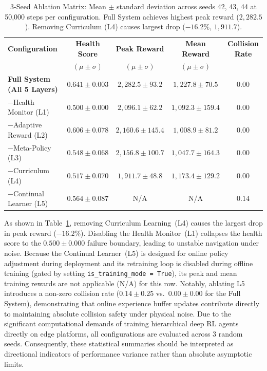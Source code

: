 \documentclass[11pt,a4paper]{article}
\begin{document}
\begin{table}[H]
\centering
\small
\begin{tabular}{lcccc}
\toprule
\textbf{Configuration} & \textbf{Health Score} & \textbf{Peak Reward} & \textbf{Mean Reward} & \textbf{Collision Rate} \\
& $(\mu \pm \sigma)$ & $(\mu \pm \sigma)$ & $(\mu \pm \sigma)$ & \\
\midrule
\textbf{Full System (All 5 Layers)} & $0.641 \pm 0.003$ & $2,282.5 \pm 93.2$ & $1,227.8 \pm 70.5$ & $0.00$ \\
$-$Health Monitor (L1) & $0.500 \pm 0.000$ & $2,096.1 \pm 62.2$ & $1,092.3 \pm 159.4$ & $0.00$ \\
$-$Adaptive Reward (L2) & $0.606 \pm 0.078$ & $2,160.6 \pm 145.4$ & $1,008.9 \pm 81.2$ & $0.00$ \\
$-$Meta-Policy (L3) & $0.548 \pm 0.068$ & $2,156.8 \pm 100.7$ & $1,047.7 \pm 164.3$ & $0.00$ \\
$-$Curriculum (L4) & $0.517 \pm 0.070$ & $1,911.7 \pm 48.8$ & $1,173.4 \pm 129.2$ & $0.00$ \\
$-$Continual Learner (L5) & $0.564 \pm 0.087$ & N/A & N/A & $0.14$ \\
\bottomrule
\end{tabular}
\caption{3-Seed Ablation Matrix: Mean $\pm$ standard deviation across seeds 42, 43, 44 at 50,000 steps per configuration. Full System achieves highest peak reward ($2,282.5$). Removing Curriculum (L4) causes largest drop ($-16.2\%$, $1,911.7$).}
\label{tab:ablation}
\end{table}

As shown in Table~\ref{tab:ablation}, removing Curriculum Learning~(L4) causes the largest drop in peak reward ($-16.2\%$). Disabling the Health Monitor~(L1) collapses the health score to the $0.500 \pm 0.000$ failure boundary, leading to unstable navigation under noise. Because the Continual Learner~(L5) is designed for online policy adjustment during deployment and its retraining loop is disabled during offline training (gated by setting \texttt{is\_training\_mode = True}), its peak and mean training rewards are not applicable (N/A) for this row. Notably, ablating L5 introduces a non-zero collision rate ($0.14 \pm 0.25$ vs.\ $0.00 \pm 0.00$ for the Full System), demonstrating that online experience buffer updates contribute directly to maintaining absolute collision safety under physical noise.
Due to the significant computational demands of training hierarchical deep RL agents directly on edge platforms, all configurations are evaluated across 3 random seeds. Consequently, these statistical summaries should be interpreted as directional indicators of performance variance rather than absolute asymptotic limits.
\end{document}
